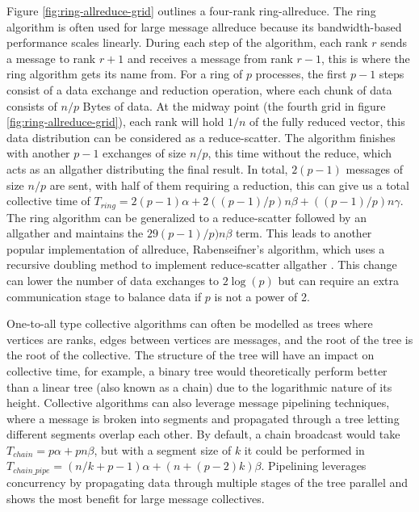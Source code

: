
Figure \ref{fig:ring-allreduce-grid} outlines a four-rank ring-allreduce.
The ring algorithm is often used for large message allreduce because its bandwidth-based performance scales linearly.
During each step of the algorithm, each rank $r$ sends a message to rank $r+1$ and receives a message from rank $r-1$, this is where the ring algorithm gets its name from.
For a ring of $p$ processes, the first $p-1$ steps consist of a data exchange and reduction operation, where each chunk of data consists of $n/p$ Bytes of data. 
At the midway point (the fourth grid in figure \ref{fig:ring-allreduce-grid}), each rank will hold $1/n$ of the fully reduced vector, this data distribution can be considered as a reduce-scatter.
The algorithm finishes with another $p-1$ exchanges of size $n/p$, this time without the reduce, which acts as an allgather distributing the final result.
In total, $2(p-1)$ messages of size $n/p$ are sent, with half of them requiring a reduction, this can give us a total collective time of $T_{ring} = 2(p-1)\alpha + 2((p-1)/p)n\beta + ((p-1)/p)n\gamma$.
The ring algorithm can be generalized to a reduce-scatter followed by an allgather and maintains the $29(p-1)/p)n\beta$ term.
This leads to another popular implementation of allreduce, Rabenseifner's algorithm, which uses a recursive doubling method to implement reduce-scatter allgather \cite{Rabenseifner2004OptOfCollRedOps}.
This change can lower the number of data exchanges to $2\log(p)$ but can require an extra communication stage to balance data if $p$ is not a power of 2.

One-to-all type collective algorithms can often be modelled as trees where vertices are ranks, edges between vertices are messages, and the root of the tree is the root of the collective.
The structure of the tree will have an impact on collective time, for example, a binary tree would theoretically perform better than a linear tree (also known as a chain) due to the logarithmic nature of its height.
Collective algorithms can also leverage message pipelining techniques, where a message is broken into segments and propagated through a tree letting different segments overlap each other.
By default, a chain broadcast would take $T_{chain}=p\alpha+pn\beta$, but with a segment size of $k$ it could be performed in $T_{chain\_pipe}=(n/k+p-1)\alpha+(n+(p-2)k)\beta$.
Pipelining leverages concurrency by propagating data through multiple stages of the tree parallel and shows the most benefit for large message collectives.

